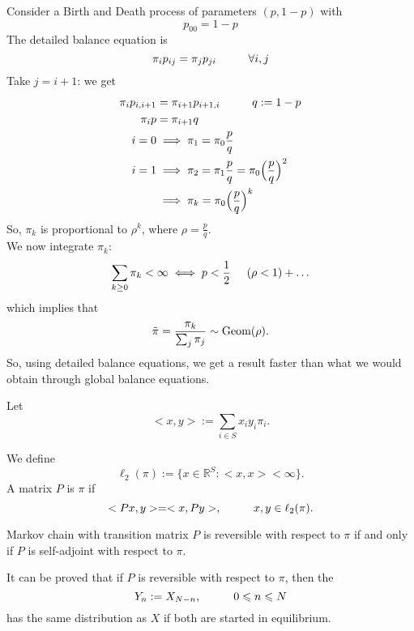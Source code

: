 \documentclass{article}
\begin{document}
	\begin{example}
		Consider a Birth and Death process of parameters $(p,1-p)$ with 
		\begin{equation*}
			p_{00} = 1-p
		\end{equation*}
		The detailed balance equation is
		\begin{equation*}
			\pi_i p_{ij} = \pi_j p_{ji}   \hspace{1 cm} \forall i,j
		\end{equation*}
		Take $j=i+1$: we get
		\begin{align*}
			\pi_i p_{i,i+1} &= \pi_{i+1} p_{i+1,i}  \hspace{1 cm} q:=1-p \\
			\pi_i p &= \pi_{i+1} q\\
			i = 0 &\implies \pi_1 = \pi_0 \frac{p}{q}\\
			i = 1 &\implies \pi_2 = \pi_1 \frac{p}{q} = \pi_0 \Big(\frac{p}{q}\Big)^2 \\
			&\implies \pi_k = \pi_0 \Big(\frac{p}{q}\Big)^k
		\end{align*}
		So, $\pi_k$ is proportional to $\rho^k$, where $\rho = \frac{p}{q}$. \\
		We now integrate $\pi_k$:
		\begin{equation*}
			\sum_{k \geq 0} \pi_k < \infty \iff p < \frac{1}{2} \hspace{0.5 cm} (\rho < 1) + \ldots
		\end{equation*}
		which implies that 
		\begin{equation*}
			\Tilde{\pi} = \frac{\pi_k}{\sum_j \pi_j} \sim \text{Geom}(\rho).
		\end{equation*}
		So, using detailed balance equations, we get a result faster than what we would obtain through global balance equations.
	\end{example}
	Let 
	\begin{equation*}
		<x,y>:= \sum_{i \in S} x_i y_i \pi_i.
	\end{equation*}
	\begin{definition}
		We define 
		\begin{equation*}
			\ell_2(\pi) := \{x \in \mathbb{R}^S: <x,x> < \infty\}.
		\end{equation*}
		A matrix $P$ is  $\pi$ if 
		\begin{equation*}
			<Px,y> = <x, Py>, \hspace{1 cm} x,y \in \ell_2(\pi).
		\end{equation*}
	\end{definition}\begin{proposition}
		Markov chain with transition matrix $P$ is reversible with respect to $\pi$ if and only if $P$ is self-adjoint with respect to $\pi$.
	\end{proposition}
	It can be proved that if $P$ is reversible with respect to $\pi$, then the 
	\begin{equation*}
		Y_n := X_{N-n}, \hspace{1 cm} 0 \leqslant n \leqslant N
	\end{equation*}
	has the same distribution as $X$ if both are started in equilibrium.
\end{document}
